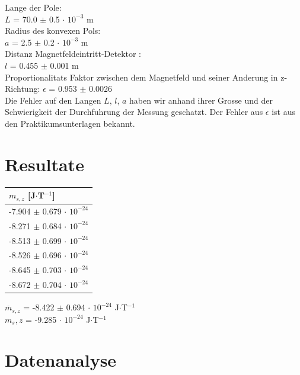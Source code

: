 \documentclass[a4paper,parskip,11pt, DIV12]{scrreprt}
\begin{document}
Lange der Pole:\\
$L$ = 70.0 $\pm$ 0.5 $\cdot$ $10^{-3}$ m\\
Radius des konvexen Pols:\\
$a$ = 2.5 $\pm$ 0.2 $\cdot$ $10^{-3}$ m\\
Distanz Magnetfeldeintritt-Detektor :\\
$l$ = 0.455 $\pm$ 0.001 m\\
Proportionalitats Faktor zwischen dem Magnetfeld und seiner Anderung in z-Richtung:
$\epsilon$ = 0.953 $\pm$ 0.0026\\


Die Fehler auf den Langen $L$, $l$, $a$ haben wir anhand ihrer Grosse und der Schwierigkeit der Durchfuhrung der Messung geschatzt. Der Fehler aus $\epsilon$ ist aus den Praktikumsunterlagen bekannt.
\clearpage

\chapter{Resultate}

\begin{table}[H]
\centering
\renewcommand{\arraystretch}{1.2} %
\setlength{\tabcolsep}{3mm} %
\begin{tabular}{l}
$m_{s,z}$ [J$\cdot$T$^{-1}$] \\ \hline
-7.904 $\pm$ 0.679 $\cdot$ $10^{-24}$\\
-8.271 $\pm$ 0.684 $\cdot$ $10^{-24}$\\
-8.513 $\pm$ 0.699 $\cdot$ $10^{-24}$\\
-8.526 $\pm$ 0.696 $\cdot$ $10^{-24}$\\
-8.645 $\pm$ 0.703 $\cdot$ $10^{-24}$\\
-8.672 $\pm$ 0.704 $\cdot$ $10^{-24}$\\
\end{tabular}
\end{table} 

$\overline{m}_{s,z}$ = -8.422 $\pm$ 0.694 $\cdot$ $10^{-24}$ J$\cdot$T$^{-1}$\\
$m_s,z$ = -9.285 $\cdot$ $10^{-24}$ J$\cdot$T$^{-1}$   \footnotesize{ \cite{https://en.wikipedia.org} }


\clearpage


\chapter{Datenanalyse}
\end{document}
